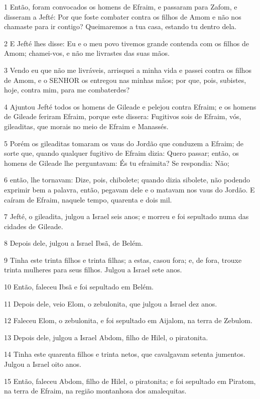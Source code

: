 \par 1 Então, foram convocados os homens de Efraim, e passaram para Zafom, e disseram a Jefté: Por que foste combater contra os filhos de Amom e não nos chamaste para ir contigo? Queimaremos a tua casa, estando tu dentro dela.
\par 2 E Jefté lhes disse: Eu e o meu povo tivemos grande contenda com os filhos de Amom; chamei-vos, e não me livrastes das suas mãos.
\par 3 Vendo eu que não me livráveis, arrisquei a minha vida e passei contra os filhos de Amom, e o SENHOR os entregou nas minhas mãos; por que, pois, subistes, hoje, contra mim, para me combaterdes?
\par 4 Ajuntou Jefté todos os homens de Gileade e pelejou contra Efraim; e os homens de Gileade feriram Efraim, porque este dissera: Fugitivos sois de Efraim, vós, gileaditas, que morais no meio de Efraim e Manassés.
\par 5 Porém os gileaditas tomaram os vaus do Jordão que conduzem a Efraim; de sorte que, quando qualquer fugitivo de Efraim dizia: Quero passar; então, os homens de Gileade lhe perguntavam: És tu efraimita? Se respondia: Não;
\par 6 então, lhe tornavam: Dize, pois, chibolete; quando dizia sibolete, não podendo exprimir bem a palavra, então, pegavam dele e o matavam nos vaus do Jordão. E caíram de Efraim, naquele tempo, quarenta e dois mil.
\par 7 Jefté, o gileadita, julgou a Israel seis anos; e morreu e foi sepultado numa das cidades de Gileade.
\par 8 Depois dele, julgou a Israel Ibsã, de Belém.
\par 9 Tinha este trinta filhos e trinta filhas; a estas, casou fora; e, de fora, trouxe trinta mulheres para seus filhos. Julgou a Israel sete anos.
\par 10 Então, faleceu Ibsã e foi sepultado em Belém.
\par 11 Depois dele, veio Elom, o zebulonita, que julgou a Israel dez anos.
\par 12 Faleceu Elom, o zebulonita, e foi sepultado em Aijalom, na terra de Zebulom.
\par 13 Depois dele, julgou a Israel Abdom, filho de Hilel, o piratonita.
\par 14 Tinha este quarenta filhos e trinta netos, que cavalgavam setenta jumentos. Julgou a Israel oito anos.
\par 15 Então, faleceu Abdom, filho de Hilel, o piratonita; e foi sepultado em Piratom, na terra de Efraim, na região montanhosa dos amalequitas.

